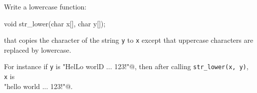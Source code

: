Write a lowercase function:
\begin{console}
void str_lower(char x[], char y[]);
\end{console}
that
copies the character of the string \verb!y! to
\verb!x! except that
uppercase characters are replaced by
lowercase.

For instance
if \verb!y! is \verb@"HelLo worlD ... 123!"@,
then after calling
\verb!str_lower(x, y)!, 
\verb!x! is
\\
\verb@"hello world ... 123!"@.


